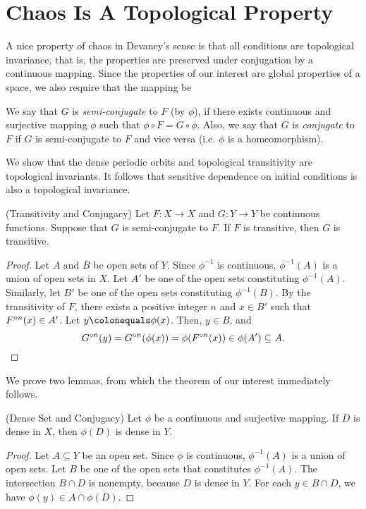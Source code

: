 \documentclass[12pt,draft,twoside]{book}
\begin{document}
\section{Chaos Is A Topological Property}
A nice property of chaos in Devaney's sense is that all conditions are topological invariance, that is, the properties are preserved under conjugation by a continuous mapping.
Since the properties of our interest are global properties of a space, we also require that the mapping be 
\begin{definition}
    We say that $G$ is \textit{semi-conjugate} to $F$ (by $\phi$), if there exists continuous and surjective mapping $\phi$ such that $\phi\circ F = G\circ\phi$.
    Also, we say that $G$ is \textit{conjugate} to $F$ if $G$ is semi-conjugate to $F$ and vice versa (i.e. $\phi$ is a homeomorphism).
\end{definition}
We show that the dense periodic orbits and topological transitivity are topological invariants.
It follows that sensitive dependence on initial conditions is also a topological invariance.
  \begin{theorem}
    (Transitivity and Conjugacy) 
    Let $F: X \to X$ and $G: Y \to Y$ be continuous functions.
    Suppose that $G$ is semi-conjugate to $F$.
    If $F$ is transitive, then $G$ is transitive.
    \label{thm:conj-trans}
    \begin{proof}
      Let $A$ and $B$ be open sets of $Y$.
      Since $\phi^{-1}$ is continuous, $\phi^{-1}(A)$ is a union of open sets in $X$.
      Let $A'$ be one of the open sets constituting $\phi^{-1}(A)$.
      Similarly, let $B'$ be one of the open sets constituting $\phi^{-1}(B)$.
      By the transitivity of $F$, there exists a positive integer $n$ and $x \in B'$ such that $F^{\circ n}(x)\in A'$.
      Let $y \ceq \phi(x)$.
      Then, $y \in B$, and 
      \begin{equation*}
        G^{\circ n}(y) 
        = G^{\circ n}(\phi(x))
        = \phi(F^{\circ n}(x)) \in \phi(A') \subseteq A.
      \end{equation*}
      \end{proof}
  \end{theorem}
  We prove two lemmas, from which the theorem of our interest immediately follows.
  \begin{lemma}
    (Dense Set and Conjugacy) 
    Let $\phi$ be a continuous and surjective mapping.
    If $D$ is dense in $X$, then $\phi(D)$ is dense in $Y$.
    \label{thm:conj-dense}
    \begin{proof}
      Let $A \subseteq Y$ be an open set.
      Since $\phi$ is continuous, $\phi^{-1} (A)$ is a union of open sets.
      Let $B$ be one of the open sets that constitutes $\phi^{-1}(A)$.
      The intersection $B \cap D$ is nonempty, because $D$ is dense in $Y$.
      For each $y \in B \cap D$, we have $\phi(y) \in A \cap \phi(D)$.
    \end{proof}
  \end{lemma}
\end{document}
